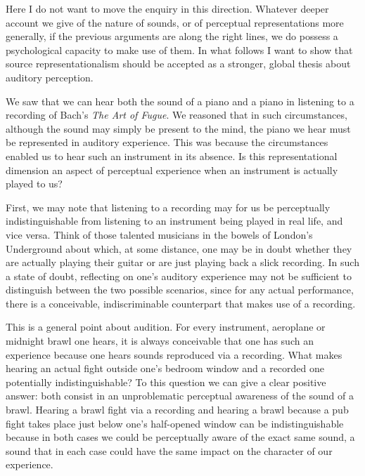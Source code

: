 \documentclass[sloppy, journal, git, bytitle, dodraft]{humapap}
\begin{document}
Here I do not want to move the enquiry in this direction. Whatever deeper account we give of the nature of sounds, or of perceptual representations more generally, if the previous arguments are along the right lines, we do possess a psychological capacity to make use of them. In what follows I want to show that source representationalism should be accepted as a stronger, global thesis about auditory perception.


\sect We saw that we can hear both the sound of a piano and a piano in listening to a recording of Bach's \emph{The Art of Fugue}. We reasoned that in such circumstances, although the sound may simply be present to the mind, the piano we hear must be represented in auditory experience. This was because the circumstances enabled us to hear such an instrument in its absence. Is this representational dimension an aspect of perceptual experience when an instrument is actually played to us? 

First, we may note that listening to a recording may for us be perceptually indistinguishable from listening to an instrument being played in real life, and vice versa. Think of those talented musicians in the bowels of London's Underground about which, at some distance, one may be in doubt whether they are actually playing their guitar or are just playing back a slick recording. In such a state of doubt, reflecting on one's auditory experience may not be sufficient to distinguish between the two possible scenarios, since for any actual performance, there is a conceivable, indiscriminable counterpart that makes use of a recording. 

This is a general point about audition. For every instrument, aeroplane or midnight brawl one hears, it is always conceivable that one has such an experience because one hears sounds reproduced via a recording. What makes hearing an actual fight outside one's bedroom window and a recorded one potentially indistinguishable? To this question we can give a clear positive answer: both consist in an unproblematic perceptual awareness of the sound of a brawl. Hearing a brawl fight via a recording and hearing a brawl because a pub fight takes place just below one's half-opened window can be indistinguishable because in both cases we could be perceptually aware of the exact same sound, a sound that in each case could have the same impact on the character of our experience.
\end{document}
